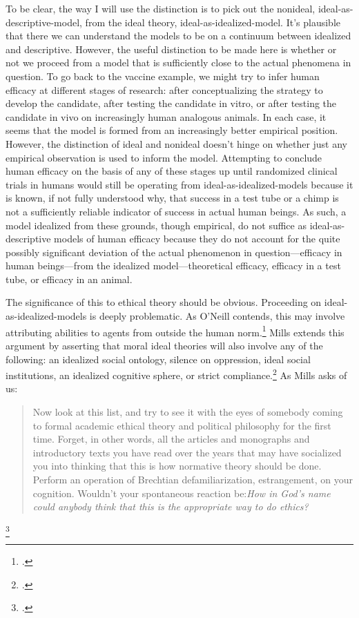 \documentclass[letterpaper,notitlepage,12pt]{article}
\begin{document}
To be clear, the way I will use the distinction is to pick out the nonideal,
ideal-as-descriptive-model, from the ideal theory, ideal-as-idealized-model.
It's plausible that there we can understand the models to be on a continuum
between idealized and descriptive.
However, the useful distinction to be made here is whether or not we proceed
from a model that is sufficiently close to the actual phenomena in question.
To go back to the vaccine example, we might try to infer human efficacy at
different stages of research: after conceptualizing the strategy to develop the
candidate, after testing the candidate in vitro, or after testing the candidate
in vivo on increasingly human analogous animals.
In each case, it seems that the model is formed from an increasingly better
empirical position.
However, the distinction of ideal and nonideal doesn't hinge on whether just any
empirical observation is used to inform the model.
Attempting to conclude human efficacy on the basis of any of these stages up
until randomized clinical trials in humans  would
still be operating from ideal-as-idealized-models because it is known, if not 
fully understood why, that success in a test tube or a chimp is not a sufficiently 
reliable indicator of success in actual human beings.
As such, a model idealized from these grounds, though empirical, do not suffice
as ideal-as-descriptive models of human efficacy because they do not account for
the quite possibly significant deviation of the actual phenomenon in 
question---efficacy in human beings---from the idealized model---theoretical
efficacy, efficacy in a test tube, or efficacy in an animal.

The significance of this to ethical theory should be obvious.
Proceeding on ideal-as-idealized-models is deeply problematic.
As O'Neill contends, this may involve attributing abilities to agents from
outside the human norm.\footcite[p. 56]{oneill_abstraction_1987}
Mills extends this argument by asserting that moral ideal theories will also
involve any of the following: an idealized social ontology, silence on
oppression, ideal social institutions, an idealized cognitive sphere, or strict
compliance.\footcite[p. 168-9]{mills_ideal_2005}
As Mills asks of us: \blockquote{Now look at
  this list, and try to see it with the eyes of somebody coming to formal
  academic ethical theory and political philosophy for the first time. Forget,
  in other words, all the articles and monographs and introductory texts you
  have read over the years that may have socialized you into thinking that this
  is how normative theory should be done. Perform an operation of Brechtian
  defamiliarization, estrangement, on your cognition. Wouldn't your spontaneous
  reaction be:\textit{How in God's name could anybody think that this is the
appropriate way to do ethics?}}\footcite[p. 169]{mills_ideal_2005}
\end{document}
